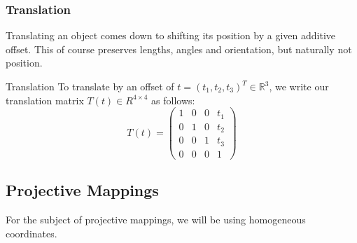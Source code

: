 \documentclass[english]{panikzettel}
\begin{document}
\begin{halfboxl}
\vspace{-\baselineskip}
\subsubsection*{Translation}

Translating an object comes down to shifting its position by a given additive offset. This of course preserves lengths, angles and orientation, but naturally not position.
\end{halfboxl}%
\begin{halfboxr}
\vspace{-\baselineskip}
\begin{defi}{Translation}
To translate by an offset of \linebreak $t=(t_1, t_2, t_3)^T \in \mathbb{R}^3$, we write our translation matrix $T(t)\in R^{4 \times 4}$ as follows:
$$T(t)=\begin{pmatrix}
1 & 0 & 0 & t_1 \\ 0 & 1 & 0 & t_2 \\ 0 & 0 & 1 & t_3 \\ 0 & 0 & 0 & 1
\end{pmatrix}$$
\end{defi}
\end{halfboxr}

\subsection{Projective Mappings}

For the subject of projective mappings, we will be using homogeneous coordinates.
\end{document}
